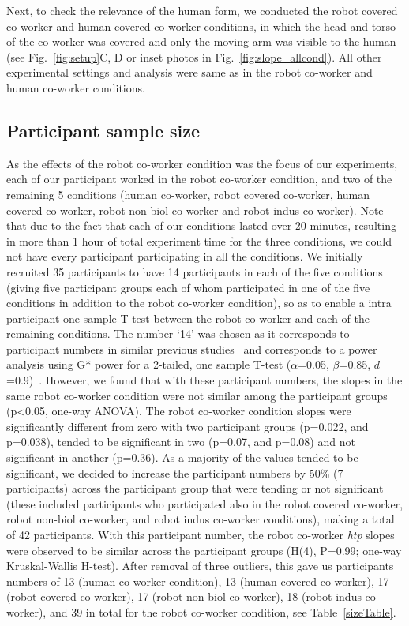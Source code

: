 Next, to check the relevance of the human form, we conducted the robot covered co-worker and human covered co-worker conditions, in which the head and torso of the co-worker was covered and only the moving arm was visible to the human (see Fig.~\ref{fig:setup}C, D or inset photos in Fig.~\ref{fig:slope_allcond}). All other experimental settings and analysis were same as in the robot co-worker and human co-worker conditions.


\subsection{Participant sample size}

As the effects of the robot co-worker condition was the focus of our experiments, each of our participant worked in the robot co-worker condition, and two of the remaining 5 conditions (human co-worker, robot covered co-worker, human covered co-worker, robot non-biol co-worker and robot indus co-worker). Note that due to the fact that each of our conditions lasted over 20 minutes, resulting in more than 1 hour of total experiment time for the three conditions, we could not have every participant participating in all the conditions. We initially recruited 35 participants to have 14 participants in each of the five conditions (giving five participant groups each of whom participated in one of the five conditions in addition to the robot co-worker condition), so as to enable a intra participant one sample T-test between the robot co-worker and each of the remaining conditions. The number `14' was chosen as it corresponds to participant numbers in similar previous studies~\cite{Bisio:PlosOne:2010,Bisio:PlosOne:2014} and corresponds to a power analysis using G* power for a 2-tailed, one sample T-test ($\alpha$=0.05, $\beta$=0.85, $d$=0.9)~\cite{Erdfelder:JBRMIC:1996, Verma:power_analysis:2017}. However, we found that with these participant numbers, the slopes in the same robot co-worker condition were not similar among the participant groups (p\textless 0.05, one-way ANOVA). The robot co-worker condition slopes were significantly different from zero with two participant groups (p=0.022, and p=0.038), tended to be significant in two (p=0.07, and p=0.08) and not significant in another (p=0.36). As a majority of the values tended to be significant, we decided to increase the participant numbers by 50\% (7 participants) across the participant group that were tending or not significant (these included participants who participated also in the robot covered co-worker, robot non-biol co-worker, and robot indus co-worker conditions), making a total of 42 participants. With this participant number, the robot co-worker {\it htp} slopes were observed to be similar across the participant groups (H(4), P=0.99; one-way Kruskal-Wallis H-test). After removal of three outliers, this gave us participants numbers of 13 (human co-worker condition), 13 (human covered co-worker), 17 (robot covered co-worker), 17 (robot non-biol co-worker), 18 (robot indus co-worker), and 39 in total for the robot co-worker condition, see Table~\ref{sizeTable}.

